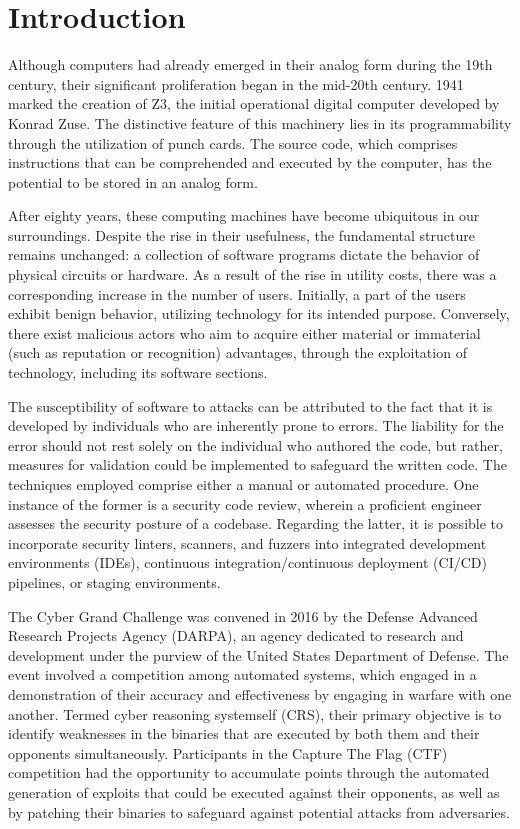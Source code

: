 \documentclass[../main.tex]{subfiles}
\begin{document}
\hypertarget{introduction}{%
\chapter{Introduction}\label{introduction}}

Although computers had already emerged in their analog form during the
19th century, their significant proliferation began in the mid-20th
century. 1941 marked the creation of Z3, the initial operational digital
computer developed by Konrad Zuse. The distinctive feature of this
machinery lies in its programmability through the utilization of punch
cards. The source code, which comprises instructions that can be
comprehended and executed by the computer, has the potential to be
stored in an analog form.

After eighty years, these computing machines have become ubiquitous in
our surroundings. Despite the rise in their usefulness, the fundamental
structure remains unchanged: a collection of software programs dictate
the behavior of physical circuits or hardware. As a result of the rise
in utility costs, there was a corresponding increase in the number of
users. Initially, a part of the users exhibit benign behavior, utilizing
technology for its intended purpose. Conversely, there exist malicious
actors who aim to acquire either material or immaterial (such as
reputation or recognition) advantages, through the exploitation of
technology, including its software sections.

The susceptibility of software to attacks can be attributed to the fact
that it is developed by individuals who are inherently prone to errors.
The liability for the error should not rest solely on the individual who
authored the code, but rather, measures for validation could be
implemented to safeguard the written code. The techniques employed
comprise either a manual or automated procedure. One instance of the
former is a security code review, wherein a proficient engineer assesses
the security posture of a codebase. Regarding the latter, it is possible
to incorporate security linters, scanners, and fuzzers into integrated
development environments (IDEs), continuous integration/continuous
deployment (CI/CD) pipelines, or staging environments.

The Cyber Grand Challenge was convened in 2016 by the Defense Advanced
Research Projects Agency (DARPA), an agency dedicated to research and
development under the purview of the United States Department of
Defense. The event involved a competition among automated systems, which
engaged in a demonstration of their accuracy and effectiveness by
engaging in warfare with one another. Termed cyber reasoning systemself (CRS),
their primary objective is to identify weaknesses in the binaries that
are executed by both them and their opponents simultaneously.
Participants in the Capture The Flag (CTF) competition had the opportunity to
accumulate points through the automated generation of exploits that
could be executed against their opponents, as well as by patching their
binaries to safeguard against potential attacks from adversaries.
\end{document}
